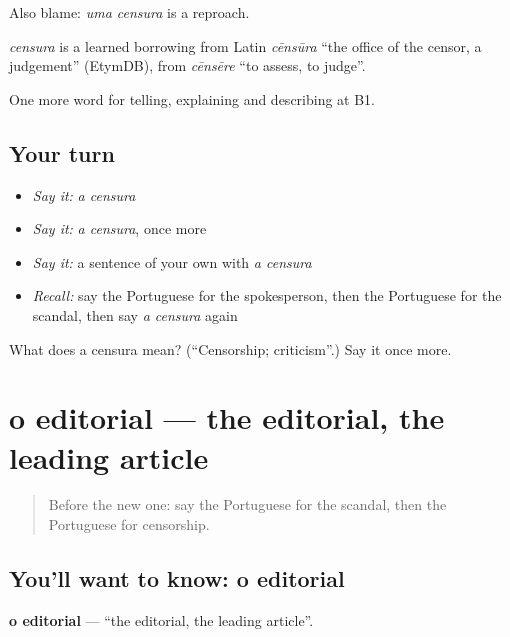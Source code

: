 Also blame: \emph{uma censura} is a reproach.

\begin{cousinweb}
\emph{censura} is a learned borrowing from Latin \emph{cēnsūra} \textquotedblleft{}the office of the censor, a judgement\textquotedblright{} (EtymDB), from \emph{cēnsēre} \textquotedblleft{}to assess, to judge\textquotedblright{}.
\end{cousinweb}

\begin{grammarlens}[title={What you've built}]
One more word for telling, explaining and describing at B1.
\end{grammarlens}

\subsection*{Your turn}
\begin{itemize}
\raggedright
  \item \emph{Say it:} \emph{a censura}
  \item \emph{Say it:} \emph{a censura}, once more
  \item \emph{Say it:} a sentence of your own with \emph{a censura}
  \item \emph{Recall:} say the Portuguese for the spokesperson, then the Portuguese for the scandal, then say \emph{a censura} again
\end{itemize}

\begin{tcolorbox}[breakable,colback=teal!4,colframe=teal!35!black,title={Before you move on}]
What does a censura mean? (\textquotedblleft{}Censorship; criticism\textquotedblright{}.) Say it once more.
\end{tcolorbox}
\section[o editorial]{o editorial — the editorial, the leading article}

\label{lesson:PT-C284-editorial}



\begin{quote}
Before the new one: say the Portuguese for the scandal, then the Portuguese for censorship.
\end{quote}

\subsection*{You'll want to know: o editorial}
\textbf{o editorial} — \textquotedblleft{}the editorial, the leading article\textquotedblright{}.

